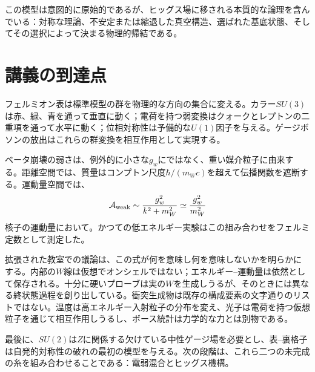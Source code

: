 \begin{classroomqa}
\end{classroomqa}

この模型は意図的に原始的であるが、ヒッグス場に移される本質的な論理を含んでいる：対称な理論、不安定または縮退した真空構造、選ばれた基底状態、そしてその選択によって決まる物理的帰結である。

\section{講義の到達点}

フェルミオン表は標準模型の群を物理的な方向の集合に変える。カラー\(SU(3)\)は赤、緑、青を通って垂直に動く；電荷を持つ弱変換はクォークとレプトンの二重項を通って水平に動く；位相対称性は予備的な\(U(1)\)因子を与える。ゲージボソンの放出はこれらの群変換を相互作用として実現する。

ベータ崩壊の弱さは、例外的に小さな\(g_w\)にではなく、重い媒介粒子に由来する。距離空間では、質量はコンプトン尺度\(\hbar/(m_Wc)\)を超えて伝播関数を遮断する。運動量空間では、
\begin{equation}
  \mathcal A_{\rm weak}
  \sim\frac{g_w^2}{k^2+m_W^2}
  \simeq\frac{g_w^2}{m_W^2}
\end{equation}
核子の運動量において。かつての低エネルギー実験はこの組み合わせをフェルミ定数として測定した。

拡張された教室での議論は、この式が何を意味し何を意味しないかを明らかにする。内部の\(W\)線は仮想でオンシェルではない；エネルギー--運動量は依然として保存される。十分に硬いプローブは実の\(W\)を生成しうるが、そのときには異なる終状態過程を創り出している。衝突生成物は既存の構成要素の文字通りのリストではない。温度は高エネルギー入射粒子の分布を変え、光子は電荷を持つ仮想粒子を通じて相互作用しうるし、ボース統計は力学的な力とは別物である。

最後に、\(SU(2)\)は\(Z\)に関係する欠けている中性ゲージ場を必要とし、表--裏格子は自発的対称性の破れの最初の模型を与える。次の段階は、これら二つの未完成の糸を組み合わせることである：電弱混合とヒッグス機構。